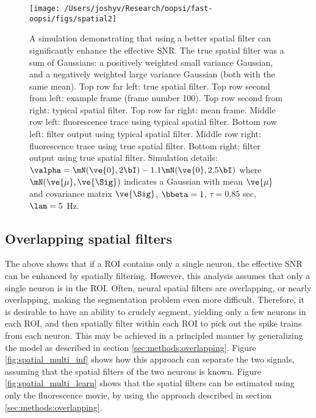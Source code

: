 \begin{figure}[h!]
\centering \texttt{[image: /Users/joshyv/Research/oopsi/fast-oopsi/figs/spatial2]}
\caption[spatial filtering can improve effective SNR]{A simulation demonstrating that using a better spatial filter can significantly enhance the effective SNR. The true spatial filter was a sum of Gaussians: a positively weighted small variance Gaussian, and a negatively weighted large variance Gaussian (both with the same mean).  Top row far left: true spatial filter.  Top row second from left: example frame (frame number 100). Top row second from right: typical spatial filter.   Top row far right: mean frame.  Middle row left: fluorescence trace using typical spatial filter. Bottom row left: \foopsi filter output using typical spatial filter.  Middle row right: fluorescence trace using true spatial filter.  Bottom right: \foopsi filter output using true spatial filter. Simulation details: $\valpha=\mN(\ve{0},2 \bI)-1.1 \mN(\ve{0},2.5 \bI)$ where $\mN(\ve{\mu},\ve{\Sig})$ indicates a Gaussian with mean $\ve{\mu}$ and covariance matrix $\ve{\Sig}$, $\bbeta=1$, $\tau=0.85$ sec, $\lam=5$ Hz.} \label{fig:spatial} 
\end{figure}



\subsection{Overlapping spatial filters} \label{sec:results:overlapping}


The above shows that if a ROI contains only a single neuron, the effective SNR can be enhanced by spatially filtering.  However, this analysis assumes that only a single neuron is in the ROI.  Often, neural spatial filters are overlapping, or nearly overlapping, making the segmentation problem even more difficult.  Therefore, it is desirable to have an ability to crudely segment, yielding only a few neurons in each ROI, and then spatially filter within each ROI to pick out the spike trains from each neuron.  This may be achieved in a principled manner by generalizing the model as described in section \ref{sec:methods:overlapping}.  Figure \ref{fig:spatial_multi_inf} shows how this approach can separate the two signals, assuming that the spatial filters of the two neurons is known.  %
Figure \ref{fig:spatial_multi_learn} shows that the spatial filters can be estimated using only the fluorescence movie, by using the approach described in section \ref{sec:methods:overlapping}.


